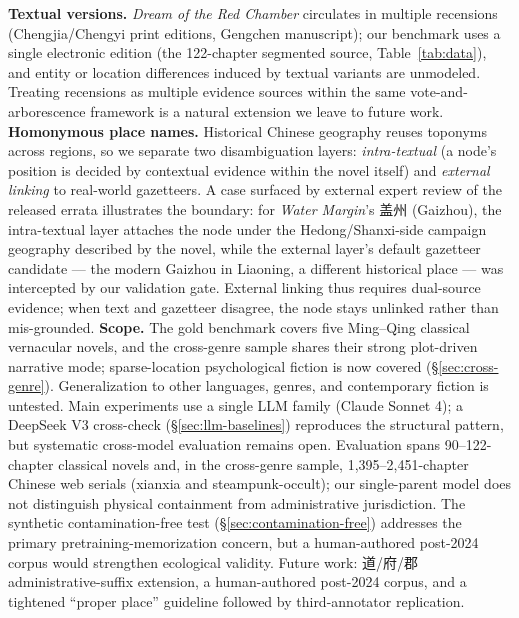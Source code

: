 \documentclass[11pt]{article}
\newenvironment{CJK}[2]{}{}
\begin{document}
\textbf{Textual versions.} \textit{Dream of the Red Chamber} circulates in multiple recensions (Chengjia/Chengyi print editions, Gengchen manuscript); our benchmark uses a single electronic edition (the 122-chapter segmented source, Table~\ref{tab:data}), and entity or location differences induced by textual variants are unmodeled. Treating recensions as multiple evidence sources within the same vote-and-arborescence framework is a natural extension we leave to future work.
\textbf{Homonymous place names.} Historical Chinese geography reuses toponyms across regions, so we separate two disambiguation layers: \emph{intra-textual} (a node's position is decided by contextual evidence within the novel itself) and \emph{external linking} to real-world gazetteers. A case surfaced by external expert review of the released errata illustrates the boundary: for \textit{Water Margin}'s \begin{CJK}{UTF8}{gbsn}盖州\end{CJK} (Gaizhou), the intra-textual layer attaches the node under the Hedong/Shanxi-side campaign geography described by the novel, while the external layer's default gazetteer candidate --- the modern Gaizhou in Liaoning, a different historical place --- was intercepted by our validation gate. External linking thus requires dual-source evidence; when text and gazetteer disagree, the node stays unlinked rather than mis-grounded.
\textbf{Scope.} The gold benchmark covers five Ming--Qing classical vernacular novels, and the cross-genre sample shares their strong plot-driven narrative mode; sparse-location psychological fiction is now covered (\S\ref{sec:cross-genre}). Generalization to other languages, genres, and contemporary fiction is untested. Main experiments use a single LLM family (Claude Sonnet 4); a DeepSeek V3 cross-check (\S\ref{sec:llm-baselines}) reproduces the structural pattern, but systematic cross-model evaluation remains open. Evaluation spans 90--122-chapter classical novels and, in the cross-genre sample, 1{,}395--2{,}451-chapter Chinese web serials (xianxia and steampunk-occult); our single-parent model does not distinguish physical containment from administrative jurisdiction. The synthetic contamination-free test (\S\ref{sec:contamination-free}) addresses the primary pretraining-memorization concern, but a human-authored post-2024 corpus would strengthen ecological validity. Future work: \begin{CJK}{UTF8}{gbsn}道\end{CJK}/\begin{CJK}{UTF8}{gbsn}府\end{CJK}/\begin{CJK}{UTF8}{gbsn}郡\end{CJK} administrative-suffix extension, a human-authored post-2024 corpus, and a tightened ``proper place'' guideline followed by third-annotator replication.
\end{document}
